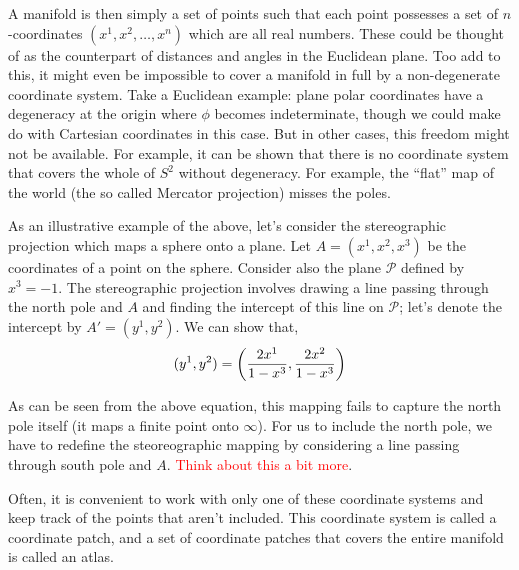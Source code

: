 \documentclass[a4paper,11pt]{article}
\begin{document}
A manifold is then simply a set of points such that each point possesses a set of $ n $-coordinates $ (x^1, x^2, \ldots, x^n) $ which are all real numbers. These could be thought of as the counterpart of distances and angles in the Euclidean plane. Too add to this, it might even be impossible to cover a manifold in full by a non-degenerate coordinate system. Take a Euclidean example: plane polar coordinates have a degeneracy at the origin where $ \phi $ becomes indeterminate, though we could make do with Cartesian coordinates in this case. But in other cases, this freedom might not be available. For example, it can be shown that there is no coordinate system that covers the whole of $ S^2 $ without degeneracy. For example, the ``flat'' map of the world (the so called Mercator projection) misses the poles.

As an illustrative example of the above, let's consider the stereographic projection which maps a sphere onto a plane. Let $ A = (x^1, x^2, x^3) $ be the coordinates of a point on the sphere. Consider also the plane $ \mathcal{P} $ defined by $ x^3 = -1 $. The stereographic projection involves drawing a line passing through the north pole and $ A $ and finding the intercept of this line on $ \mathcal{P} $; let's denote the intercept by $ A' = (y^1, y^2) $. We can show that,
\begin{equation}\label{key}
(y^1, y^2) = \qty(\dfrac{2x^1}{1 - x^3}, \dfrac{2x^2}{1 - x^3})
\end{equation}

As can be seen from the above equation, this mapping fails to capture the north pole itself (it maps a finite point onto $ \infty $). For us to include the north pole, we have to redefine the steoreographic mapping by considering a line passing through south pole and $ A $. \textcolor{red}{Think about this a bit more}.

Often, it is convenient to work with only one of these coordinate systems and keep track of the points that aren't included. This coordinate system is called  a coordinate patch, and a set of coordinate patches that covers the entire manifold is called an atlas.
\end{document}
